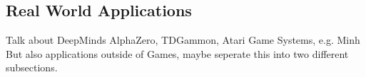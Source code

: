     \subsection{Real World Applications}
    \label{sec:games}
    Talk about DeepMinds AlphaZero, TDGammon, Atari Game Systems, e.g. Minh
    But also applications outside of Games, maybe seperate this into two different subsections.
%



    



